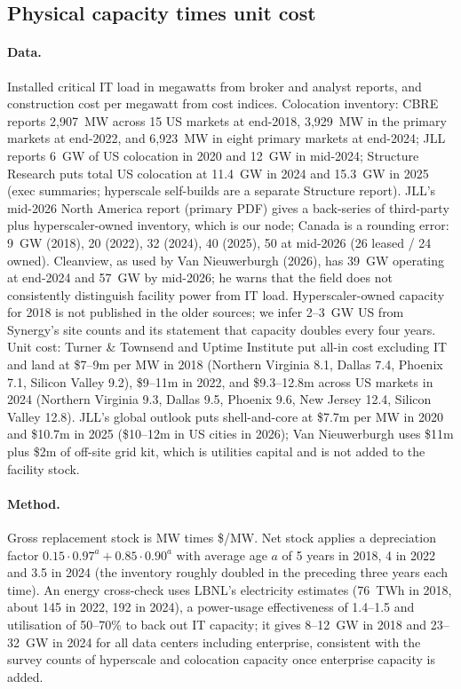 \documentclass[11pt]{article}
\begin{document}
\subsection{Physical capacity times unit cost}
\label{sec:mw}

\paragraph{Data.} Installed critical IT load in megawatts from broker and analyst reports, and construction cost per megawatt from cost indices. Colocation inventory: CBRE reports 2,907~MW across 15 US markets at end-2018, 3,929~MW in the primary markets at end-2022, and 6,923~MW in eight primary markets at end-2024; JLL reports 6~GW of US colocation in 2020 and 12~GW in mid-2024; Structure Research puts total US colocation at 11.4~GW in 2024 and 15.3~GW in 2025 (exec summaries; hyperscale self-builds are a separate Structure report). JLL's mid-2026 North America report (primary PDF) gives a back-series of third-party plus hyperscaler-owned inventory, which is our node; Canada is a rounding error: 9~GW (2018), 20 (2022), 32 (2024), 40 (2025), 50 at mid-2026 (26 leased / 24 owned). Cleanview, as used by Van Nieuwerburgh (2026), has 39~GW operating at end-2024 and 57~GW by mid-2026; he warns that the field does not consistently distinguish facility power from IT load. Hyperscaler-owned capacity for 2018 is not published in the older sources; we infer 2--3~GW US from Synergy's site counts and its statement that capacity doubles every four years. Unit cost: Turner \& Townsend and Uptime Institute put all-in cost excluding IT and land at \$7--9m per MW in 2018 (Northern Virginia 8.1, Dallas 7.4, Phoenix 7.1, Silicon Valley 9.2), \$9--11m in 2022, and \$9.3--12.8m across US markets in 2024 (Northern Virginia 9.3, Dallas 9.5, Phoenix 9.6, New Jersey 12.4, Silicon Valley 12.8). JLL's global outlook puts shell-and-core at \$7.7m per MW in 2020 and \$10.7m in 2025 (\$10--12m in US cities in 2026); Van Nieuwerburgh uses \$11m plus \$2m of off-site grid kit, which is utilities capital and is not added to the facility stock.

\paragraph{Method.} Gross replacement stock is MW times \$/MW. Net stock applies a depreciation factor $0.15\cdot 0.97^{a}+0.85\cdot 0.90^{a}$ with average age $a$ of 5 years in 2018, 4 in 2022 and 3.5 in 2024 (the inventory roughly doubled in the preceding three years each time). An energy cross-check uses LBNL's electricity estimates (76~TWh in 2018, about 145 in 2022, 192 in 2024), a power-usage effectiveness of 1.4--1.5 and utilisation of 50--70\% to back out IT capacity; it gives 8--12~GW in 2018 and 23--32~GW in 2024 for all data centers including enterprise, consistent with the survey counts of hyperscale and colocation capacity once enterprise capacity is added.
\end{document}
